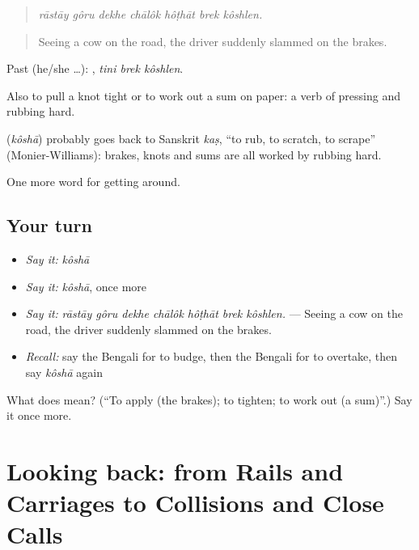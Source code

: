 \begin{quote}
\emph{rāstāy gôru dekhe chālôk hôṭhāt brek kôshlen.}
\end{quote}

\begin{quote}
Seeing a cow on the road, the driver suddenly slammed on the brakes.
\end{quote}

Past (he/she …):   , \emph{tini brek kôshlen}.

Also to pull a knot tight or to work out a sum on paper: a verb of pressing and rubbing hard.

\begin{cousinweb}
\textbf{} (\emph{kôshā}) probably goes back to Sanskrit \emph{kaṣ}, \textquotedblleft{}to rub, to scratch, to scrape\textquotedblright{} (Monier-Williams): brakes, knots and sums are all worked by rubbing hard.
\end{cousinweb}

\begin{grammarlens}[title={What you've built}]
One more word for getting around.
\end{grammarlens}

\subsection*{Your turn}
\begin{itemize}
\raggedright
  \item \emph{Say it:} \emph{kôshā}
  \item \emph{Say it:} \emph{kôshā}, once more
  \item \emph{Say it:} \emph{rāstāy gôru dekhe chālôk hôṭhāt brek kôshlen.} — Seeing a cow on the road, the driver suddenly slammed on the brakes.
  \item \emph{Recall:} say the Bengali for to budge, then the Bengali for to overtake, then say \emph{kôshā} again
\end{itemize}

\begin{tcolorbox}[breakable,colback=teal!4,colframe=teal!35!black,title={Before you move on}]
What does  mean? (\textquotedblleft{}To apply (the brakes); to tighten; to work out (a sum)\textquotedblright{}.) Say it once more.
\end{tcolorbox}
\section[(dialogue)]{Looking back: from Rails and Carriages to Collisions and Close Calls}

